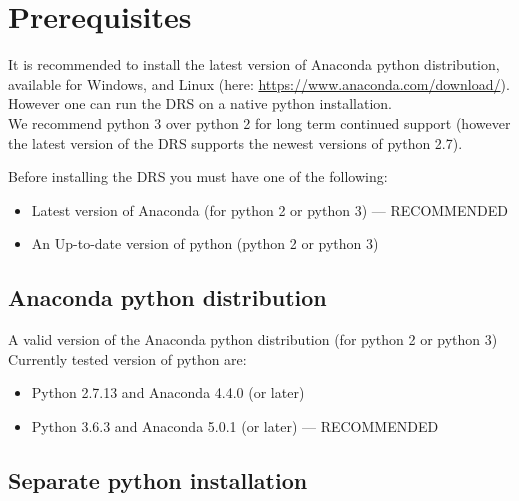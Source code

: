 \clearpage
\newpage
\section{Prerequisites}
\label{ch:install:prerequisites}

It is recommended to install the latest version of Anaconda python distribution, available for Windows, \mac and Linux (here: \url{https://www.anaconda.com/download/}). However one can run the DRS on a native python installation. \\

\noindent We recommend python 3 over python 2 for long term continued support (however the latest version of the DRS supports the newest versions of python 2.7).

\begin{note}
Before installing the DRS you must have one of the following:
\begin{itemize}
\item Latest version of Anaconda (for python 2 or python 3) --- RECOMMENDED
\item An Up-to-date version of python (python 2 or python 3)
\end{itemize}
\end{note}


\subsection{Anaconda python distribution}
\label{ch:install:prerequisites:anaconda}

A valid version of the Anaconda python distribution (for python 2 or python 3)
\noindent Currently tested version of python are:
\begin{itemize}
\item Python 2.7.13 and Anaconda 4.4.0 (or later)
\item Python 3.6.3 and Anaconda 5.0.1 (or later) --- RECOMMENDED
\end{itemize}



\subsection{Separate python installation}
\label{ch:install:prerequisites:separate_python}

